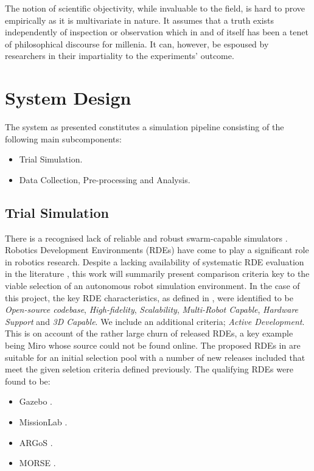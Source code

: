 \documentclass{report}
\begin{document}
The notion of scientific objectivity, while invaluable to the field, is hard to prove empirically as it is multivariate in nature. It assumes that a truth exists independently of inspection or observation which in and of itself has been a tenet of philosophical discourse for millenia. It can, however, be espoused by researchers in their impartiality to the experiments' outcome.

\newpage

\section{System Design} \label{system_design}
The system as presented constitutes a simulation pipeline consisting of the following main subcomponents:
\begin{itemize}
	\item Trial Simulation.
	\item Data Collection, Pre-processing and Analysis.
\end{itemize}

\subsection{Trial Simulation}
There is a recognised lack of reliable and robust swarm-capable simulators \cite{Noronha2016}. Robotics Development Environments (RDEs) have come to play a significant role in robotics research. Despite a lacking availability of systematic RDE evaluation in the literature \cite{Kramer2007}, this work will summarily present comparison criteria key to the viable selection of an autonomous robot simulation environment. In the case of this project, the key RDE characteristics, as defined in \cite{Kramer2007}, were identified to be \textit{Open-source codebase}, \textit{High-fidelity}, \textit{Scalability}, \textit{Multi-Robot Capable}, \textit{Hardware Support} and \textit{3D Capable}. We include an additional criteria; \textit{Active Development}. This is on account of the rather large churn of released RDEs, a key example being Miro \cite{Enderle2001} whose source could not be found online. The proposed RDEs in \cite{Kramer2007} are suitable for an initial selection pool with a number of new releases included that meet the given seletion criteria defined previously. The qualifying RDEs were found to be:
\begin{itemize}
	\item Gazebo \cite{Koenig2004}.
	\item MissionLab \cite{MISSIONLAB}.
	\item ARGoS \cite{Pinciroli2011}.
	\item MORSE \cite{Morse2011}.
\end{itemize}
\end{document}
